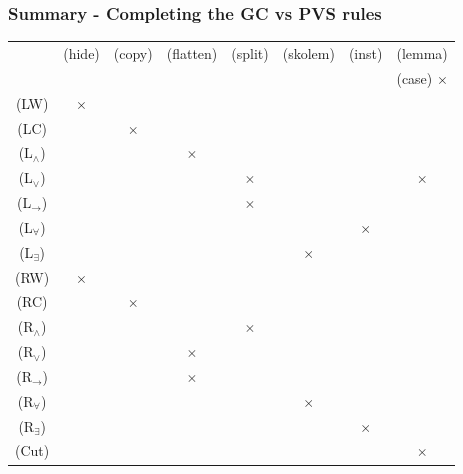 \documentclass[10pt]{beamer}
\begin{document}
\begin{frame}
\frametitle{Summary - Completing the GC vs PVS rules }
\begin{center}
\footnotesize{
\begin{tabular}{|c||c|c|c|c|c|c|c||}
\hline
& (hide) & (copy) & (flatten) & (split) & (skolem) & (inst) & (lemma)
\\%
&  & &  &  &  &  & (case) {\color{blue} $\times$}\\%
\hline
(LW) &$\times$&&&&&&\\%
(LC) &&$\times$&&&&& \\%
(L$_\wedge$)&&&$\times$&&&& \\%
(L$_\vee$)&&&&$\times$&&&{\color{blue}$\times$} \\%
(L$_\rightarrow$)&&&&$\times$&&& \\%
(L$_\forall$)&&&&&&$\times$ &\\%
(L$_\exists$)&&&&&$\times$&&\\%
\hline
(RW) &$\times$&&&&& &\\%
(RC) &&$\times$&&&& &\\%
(R$_\wedge$)&&&&$\times$&&& \\%
(R$_\vee$)&&&$\times$&&& &\\%
(R$_\rightarrow$)&&&$\times$&&& &\\%
(R$_\forall$)&&&&&$\times$& & \\%
(R$_\exists$) &&&&&&$\times$& \\%
\hline
\hline
(Cut) &&&&&&&$\times$\\%
\hline
\end{tabular}
}
\end{center}
\end{frame}


\end{document}
